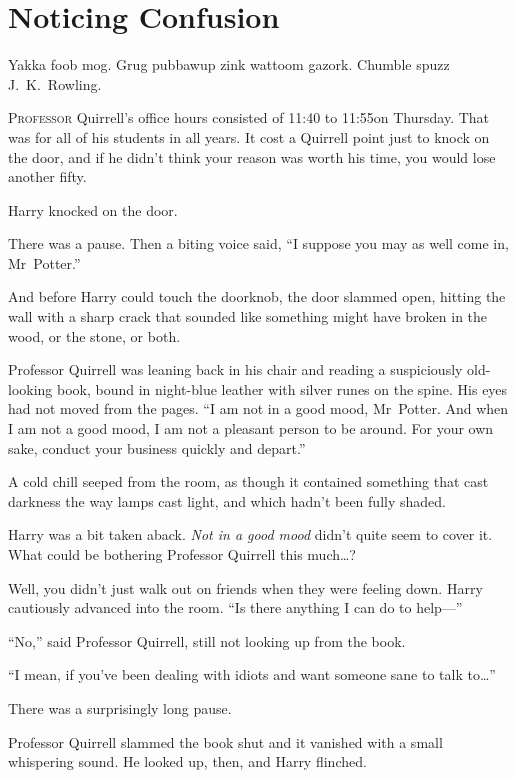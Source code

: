 \chapter{Noticing Confusion}

\begin{chapterOpeningAuthorNote}
Yakka foob mog. Grug pubbawup zink wattoom gazork. Chumble spuzz J.~K.~Rowling.
\end{chapterOpeningAuthorNote}

\lettrine{P}{rofessor} Quirrell’s office hours consisted of 11:40 to 11:55\am on Thursday. That was for all of his students in all years. It cost a Quirrell point just to knock on the door, and if he didn’t think your reason was worth his time, you would lose another fifty.

Harry knocked on the door.

There was a pause. Then a biting voice said, “I suppose you may as well come in, Mr~Potter.”

And before Harry could touch the doorknob, the door slammed open, hitting the wall with a sharp crack that sounded like something might have broken in the wood, or the stone, or both.

Professor Quirrell was leaning back in his chair and reading a suspiciously old-looking book, bound in night-blue leather with silver runes on the spine. His eyes had not moved from the pages. “I am not in a good mood, Mr~Potter. And when I am not a good mood, I am not a pleasant person to be around. For your own sake, conduct your business quickly and depart.”

A cold chill seeped from the room, as though it contained something that cast darkness the way lamps cast light, and which hadn’t been fully shaded.

Harry was a bit taken aback. \emph{Not in a good mood} didn’t quite seem to cover it. What could be bothering Professor Quirrell this much…?

Well, you didn’t just walk out on friends when they were feeling down. Harry cautiously advanced into the room. “Is there anything I can do to help—”

“No,” said Professor Quirrell, still not looking up from the book.

“I mean, if you’ve been dealing with idiots and want someone sane to talk to…”

There was a surprisingly long pause.

Professor Quirrell slammed the book shut and it vanished with a small whispering sound. He looked up, then, and Harry flinched.

